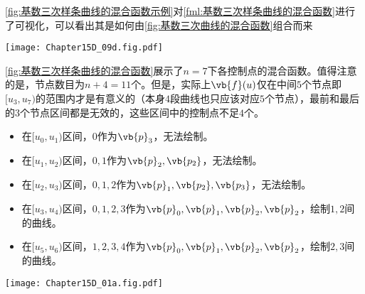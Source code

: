 \cref{fig:基数三次样条曲线的混合函数示例}对\cref{fml:基数三次样条曲线的混合函数}进行了可视化，可以看出其是如何由\cref{fig:基数三次曲线的混合函数}组合而来
\begin{Figure}[基数三次样条曲线的混合函数示例]
    \texttt{[image: Chapter15D\_09d.fig.pdf]}
\end{Figure}

\cref{fig:基数三次样条曲线的混合函数}展示了$n=7$下各控制点的混合函数。值得注意的是，节点数目为$n+4=11$个。但是，实际上$\vb{f}(u)$仅在中间$5$个节点即$[u_3,u_7)$的范围内才是有意义的（本身$4$段曲线也只应该对应$5$个节点），最前和最后的$3$个节点区间都是无效的，这些区间中的控制点不足$4$个。

\begin{itemize}
    \item 在$[u_0,u_1)$区间，$0$作为$\vb{p}_3$，无法绘制。
    \item 在$[u_1,u_2)$区间，$0,1$作为$\vb{p}_2,\vb{p_2}$，无法绘制。
    \item 在$[u_2,u_3)$区间，$0,1,2$作为$\vb{p}_1,\vb{p_2},\vb{p_3}$，无法绘制。
    \item 在$[u_3,u_4)$区间，$0,1,2,3$作为$\vb{p}_0,\vb{p}_1,\vb{p}_2,\vb{p}_2$，绘制$1,2$间的曲线。
    \item 在$[u_5,u_6)$区间，$1,2,3,4$作为$\vb{p}_0,\vb{p}_1,\vb{p}_2,\vb{p}_2$，绘制$2,3$间的曲线。
\end{itemize}





\begin{Figure}[基数三次样条曲线的混合函数]
    \texttt{[image: Chapter15D\_01a.fig.pdf]}
\end{Figure}

